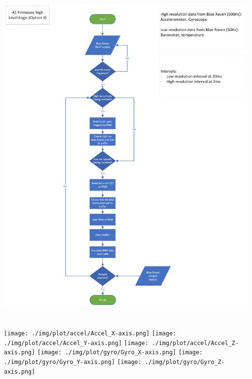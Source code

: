 \renewcommand{\thechapter}{\Alph{chapter}}
\renewcommand{\thefigure}{\Alph{chapter}.\arabic{figure}}
\renewcommand{\chaptername}{Appendix}

\setlength{\beforechapskip}{0pt}
\setlength{\afterchapskip}{0pt}
\setlength{\footskip}{5cm}
\setlrmarginsandblock{0.5cm}{0.5cm}{*}
\setulmarginsandblock{0.25cm}{0.25cm}{*}
\clearpage
\checkandfixthelayout
\chapter{}\label{apdx:A}
\begin{minipage}{\textwidth}
  \centering
  \includegraphics[height=0.85\textheight]{./img/A1_high-level.png}
\end{minipage}

\clearpage
\chapter{}\label{apdx:B}
\vfill{}
\begin{minipage}{\textwidth}
\centering\texttt{[image: ./img/plot/accel/Accel\_X-axis.png]}
\centering\texttt{[image: ./img/plot/accel/Accel\_Y-axis.png]}
\centering\texttt{[image: ./img/plot/accel/Accel\_Z-axis.png]}
\centering\texttt{[image: ./img/plot/gyro/Gyro\_X-axis.png]}
\centering\texttt{[image: ./img/plot/gyro/Gyro\_Y-axis.png]}
\centering\texttt{[image: ./img/plot/gyro/Gyro\_Z-axis.png]}
\end{minipage}
\vfill{}
